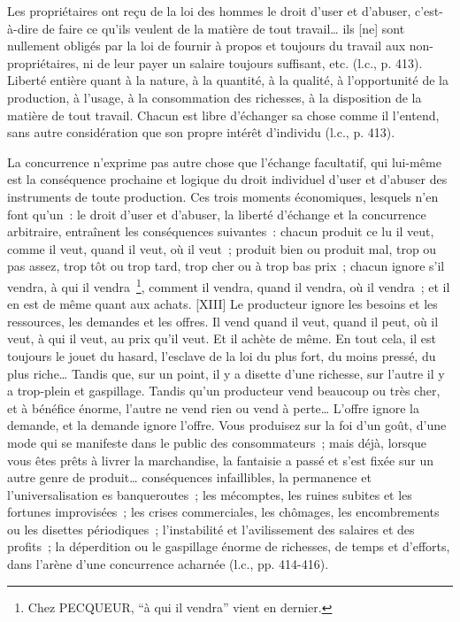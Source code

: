 \documentclass[french,twoside]{book} %
\newenvironment{quoteblock}%
  {\begin{quoting}}
  {\end{quoting}}
\newenvironment{quotebar}{%
    \def\FrameCommand{{\color{rubric!10!}\vrule width 0.5em} \hspace{0.9em}}%
    \def\OuterFrameSep{\itemsep} %
    \MakeFramed {\advance\hsize-\width \FrameRestore}
  }%
  {%
    \endMakeFramed
  }
\renewenvironment{quoteblock}%
  {%
    \savenotes
    \setstretch{0.9}
    \normalfont
    \begin{quotebar}
  }
  {%
    \end{quotebar}
    \spewnotes
  }
\begin{document}
\begin{quoteblock}
 Les propriétaires ont reçu de la loi des hommes le droit d’user et d’abuser, c’est-à-dire de faire ce qu’ils veulent de la matière de tout travail… ils [ne] sont nullement obligés par la loi de fournir à propos et toujours du travail aux non-propriétaires, ni de leur payer un salaire toujours suffisant, etc. (l.c., p. 413). Liberté entière quant à la nature, à la quantité, à la qualité, à l’opportunité de la production, à l’usage, à la consommation des richesses, à la disposition de la matière de tout travail. Chacun est libre d’échanger sa chose comme il l’entend, sans autre considération que son propre intérêt d’individu (l.c., p. 413).\par
 La concurrence n’exprime pas autre chose que l’échange facultatif, qui lui-même est la conséquence prochaine et logique du droit individuel d’user et d’abuser des instruments de toute production. Ces trois moments économiques, lesquels n’en font qu’un : le droit d’user et d’abuser, la liberté d’échange et la concurrence arbitraire, entraînent les conséquences suivantes : chacun produit ce lu il veut, comme il veut, quand il veut, où il veut ; produit bien ou produit mal, trop ou pas assez, trop tôt ou trop tard, trop cher ou à trop bas prix ; chacun ignore s’il vendra, à qui il vendra \footnote{Chez PECQUEUR, “à qui il vendra” vient en dernier.}, comment il vendra, quand il vendra, où il vendra ; et il en est de même quant aux achats. [XIII] Le producteur ignore les besoins et les ressources, les demandes et les offres. Il vend quand il veut, quand il peut, où il veut, à qui il veut, au prix qu’il veut. Et il achète de même. En tout cela, il est toujours le jouet du hasard, l’esclave de la loi du plus fort, du moins pressé, du plus riche… Tandis que, sur un point, il y a disette d’une richesse, sur l’autre il y a trop-plein et gaspillage. Tandis qu’un producteur vend beaucoup ou très cher, et à bénéfice énorme, l’autre ne vend rien ou vend à perte… L’offre ignore la demande, et la demande ignore l’offre. Vous produisez sur la foi d’un goût, d’une mode qui se manifeste dans le public des consommateurs ; mais déjà, lorsque vous êtes prêts à livrer la marchandise, la fantaisie a passé et s’est fixée sur un autre genre de produit… conséquences infaillibles, la permanence et l’universalisation es banqueroutes ; les mécomptes, les ruines subites et les fortunes improvisées ; les crises commerciales, les chômages, les encombrements ou les disettes périodiques ; l’instabilité et l’avilissement des salaires et des profits ; la déperdition ou le gaspillage énorme de richesses, de temps et d’efforts, dans l’arène d’une concurrence acharnée (l.c., pp. 414-416).
 \end{quoteblock}
\end{document}
